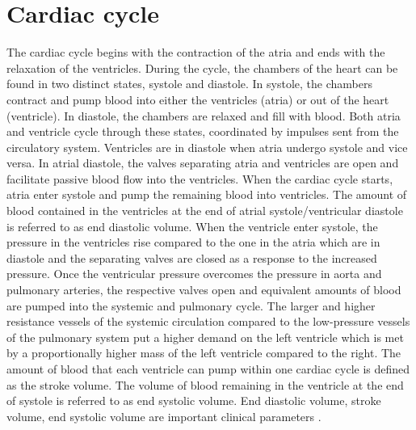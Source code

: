 \section{Cardiac cycle}
The cardiac cycle begins with the contraction of the atria and ends with the relaxation of the ventricles. During the cycle, the chambers of the heart can be found in two distinct states, systole and diastole. In systole, the chambers contract and pump blood into either the ventricles (atria) or out of the heart (ventricle). In diastole, the chambers are relaxed and fill with blood. Both atria and ventricle cycle through these states, coordinated by impulses sent from the circulatory system.  Ventricles are in diastole when atria undergo systole and vice versa. In atrial diastole, the valves separating atria and ventricles are open and facilitate passive blood flow into the ventricles. When the cardiac cycle starts, atria enter systole and pump the remaining blood into ventricles.  The amount of blood contained in the ventricles at the end of atrial systole/ventricular diastole is referred to as end diastolic volume. When the ventricle enter systole, the pressure in the ventricles rise compared to the one in the atria which are in diastole and the separating valves are closed as a response to the increased pressure. Once the ventricular pressure overcomes the pressure in aorta and pulmonary arteries, the respective valves open and equivalent amounts of blood are pumped into the systemic and pulmonary cycle. The larger and higher resistance vessels of the systemic circulation compared to the low-pressure vessels of the pulmonary system put a higher demand on the left ventricle which is met by a proportionally higher mass of the left ventricle compared to the right. The amount of blood that each ventricle can pump within one cardiac cycle is defined as the stroke volume. The volume of blood remaining in the ventricle at the end of systole is referred to as end systolic volume. End diastolic volume, stroke volume, end systolic volume are important clinical parameters \citep{Betts2013}. 

